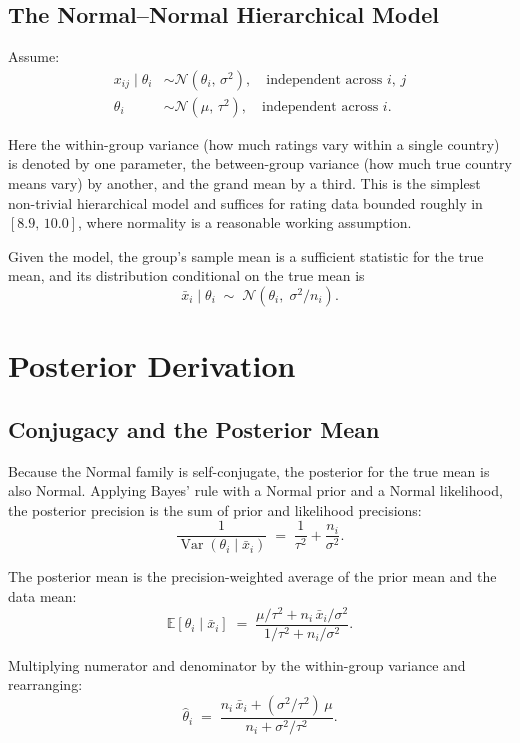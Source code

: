 \documentclass[11pt]{article}
\begin{document}
\subsection{The Normal--Normal Hierarchical Model}

Assume:
\begin{align*}
    x_{ij} \mid \theta_i &\sim \mathcal{N}(\theta_i,\, \sigma^2),
        \quad \text{independent across } i,\,j \\
    \theta_i &\sim \mathcal{N}(\mu,\, \tau^2),
        \quad \text{independent across } i.
\end{align*}

Here the within-group variance (how much ratings vary within a single
country) is denoted by one parameter, the between-group variance (how
much true country means vary) by another, and the grand mean by a third.
This is the simplest non-trivial hierarchical model and suffices for
rating data bounded roughly in $[8.9,\, 10.0]$, where normality is a
reasonable working assumption.

Given the model, the group's sample mean is a sufficient statistic for
the true mean, and its distribution conditional on the true mean is
\[
    \bar{x}_i \mid \theta_i \;\sim\; \mathcal{N}\!\left(\theta_i,\; \sigma^2 / n_i\right).
\]

\section{Posterior Derivation}

\subsection{Conjugacy and the Posterior Mean}

Because the Normal family is self-conjugate, the posterior for the true
mean is also Normal. Applying Bayes' rule with a Normal prior and a
Normal likelihood, the posterior precision is the sum of prior and
likelihood precisions:
\[
    \frac{1}{\operatorname{Var}(\theta_i \mid \bar{x}_i)}
        \;=\; \frac{1}{\tau^2} + \frac{n_i}{\sigma^2}.
\]

The posterior mean is the precision-weighted average of the prior mean
and the data mean:
\[
    \mathbb{E}[\theta_i \mid \bar{x}_i]
        \;=\; \frac{\mu / \tau^2 + n_i\,\bar{x}_i / \sigma^2}{1/\tau^2 + n_i / \sigma^2}.
\]

Multiplying numerator and denominator by the within-group variance and
rearranging:
\[
    \hat{\theta}_i \;=\; \frac{n_i\,\bar{x}_i + (\sigma^2 / \tau^2)\,\mu}{n_i + \sigma^2 / \tau^2}.
\]
\end{document}
